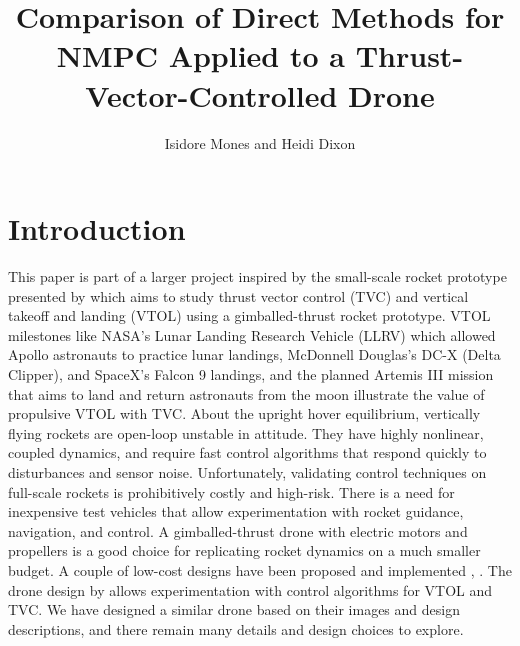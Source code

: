 \documentclass[]{article}
\title{Comparison of Direct Methods for NMPC Applied to a Thrust-Vector-Controlled Drone}
\author{Isidore Mones and Heidi Dixon}
\begin{document}
\maketitle
	
\section*{Introduction}	
	This paper is part of a larger project inspired by the small-scale rocket prototype presented by \cite{TVCDrone} which aims to study thrust vector control (TVC) and vertical takeoff and landing (VTOL) using a gimballed-thrust rocket prototype. 
	VTOL milestones like NASA's Lunar Landing Research Vehicle (LLRV) which allowed Apollo astronauts to practice lunar landings, McDonnell Douglas’s DC-X (Delta Clipper), and SpaceX's Falcon 9 landings, and the planned Artemis III mission that aims to land and return astronauts from the moon illustrate the value of propulsive VTOL with TVC. 	
	About the upright hover equilibrium, vertically flying rockets are open-loop unstable in attitude. They have highly nonlinear, coupled dynamics, and require fast control algorithms that respond quickly to disturbances and sensor noise. Unfortunately, validating control techniques on full-scale rockets is prohibitively costly and high-risk. There is a need for inexpensive test vehicles that allow experimentation with rocket guidance, navigation, and control. 
	A gimballed-thrust drone with electric motors and propellers is a good choice for replicating rocket dynamics on a much smaller budget. A couple of low-cost designs have been proposed and implemented  \citep{cheapTVC}, \citep{TVCDrone}. The drone design by \cite{TVCDrone} allows experimentation with control algorithms for VTOL and TVC. We have designed a similar drone based on their images and design descriptions, and there remain many details and design choices to explore.
\end{document}
